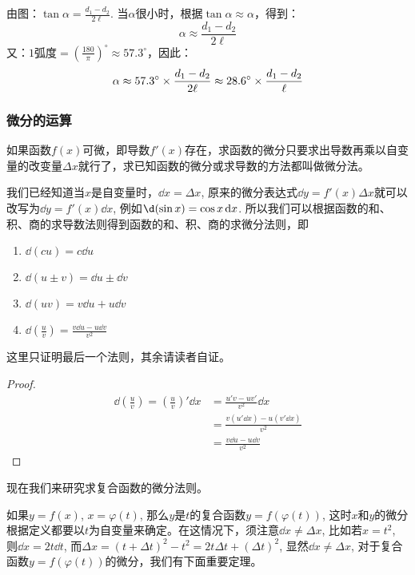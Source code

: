 \begin{solution}
由图：$\tan\alpha=\frac{d_1-d_2}{2\ell}$. 当$\alpha$很小时，根据$\tan\alpha\approx \alpha$，得到：
\[\alpha\approx \frac{d_1-d_2}{2\ell}\]
又：$1\text{弧度}=\left(\frac{180}{\pi}\right)^{\circ}\approx 57.3^{\circ}$，因此：
\[\alpha\approx 57.3^{\circ}\times \dfrac{d_1-d_2}{2\ell}\approx 28.6^{\circ}\times \dfrac{d_1-d_2}{\ell}\]
\end{solution}

\subsubsection{微分的运算}

如果函数$f(x)$可微，即导数$f'(x)$存在，求函数的微分只要求出导数再乘以自变量的改变量$\Delta x$就行了，求已知函数的微分或求导数的方法都叫做微分法。

我们已经知道当$x$是自变量时，$\dd x=\Delta x$, 原来的微分表达式$\dd y=f'(x)\Delta x$就可以改写为$\dd y=f'(x)\dd x$, 例如$\d(\sin x)=\cos x \dd x$. 所以我们可以根据函数的和、积、商的求导数法则得到函数的和、积、商的求微分法则，即
\begin{enumerate}
    \item $\dd(cu)=c\dd u$
    \item $\dd(u\pm v)=\dd u\pm \dd v$
    \item $\dd(uv)=v\dd u+u\dd v$
    \item $\dd\left(\frac{u}{v}\right)=\frac{v\dd u-u\dd v}{v^2}$
\end{enumerate}
这里只证明最后一个法则，其余请读者自证。

\begin{proof}
    \[\begin{split}
\dd\left(\frac{u}{v}\right)=\left(\frac{u}{v}\right)'\dd x&=\frac{u'v-uv'}{v^2}\dd x\\
&=\frac{v(u'\dd x)-u(v'\dd x)}{v^2}\\
&=\frac{v\dd u-u\dd v}{v^2}        
    \end{split}\]
\end{proof}

现在我们来研究求复合函数的微分法则。

如果$y=f(x)$, $x=\varphi (t)$, 那么$y$是$t$的复合函数$y=f(\varphi (t))$, 这时$x$和$y$的微分根据定义都要以$t$为自变量来确定。在这情况下，须注意$\dd x\ne \Delta x$, 比如若$x=t^2$, 则$\dd x=2t\dd t$, 而$\Delta x=(t+\Delta t)^2-t^2=2t\Delta t+(\Delta t)^2$, 显然$\dd x\ne \Delta x$, 对于复合函数$y=f(\varphi (t))$的微分，我们有下面重要定理。

